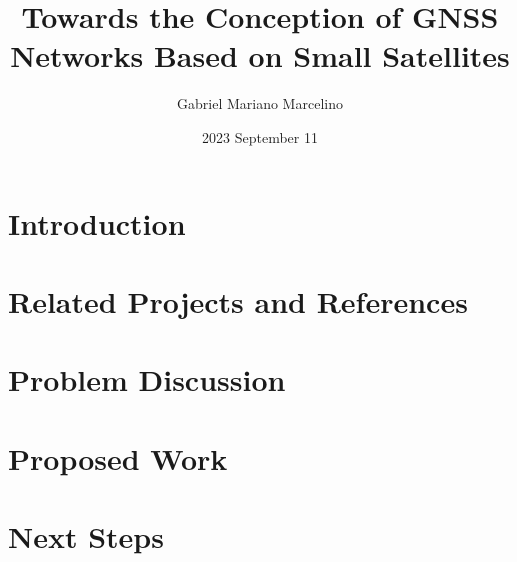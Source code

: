 \documentclass{beamer}
\title[Presentation]{Towards the Conception of GNSS Networks Based on Small Satellites}
\author[Gabriel M. Marcelino]{Gabriel Mariano Marcelino}
\institute[]{SpaceLab - UFSC}
\date{2023 September 11}
\begin{document}
    
    

    \section{Introduction}

        

    \section{Related Projects and References}

        

    \section{Problem Discussion}

        

    \section{Proposed Work}

        

    \section{Next Steps}

        

\end{document}
